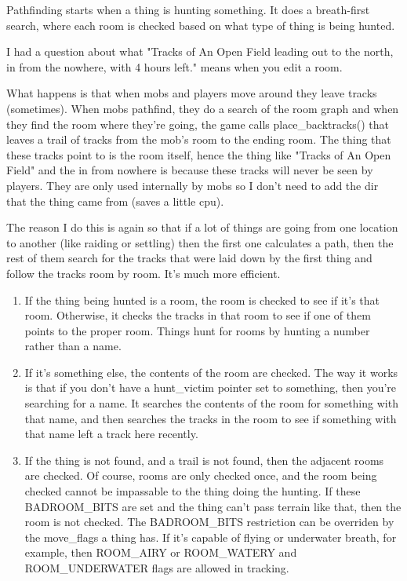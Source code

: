 Pathfinding starts when a thing is hunting something. It does a
breath-first search, where each room is checked based on what
type of thing is being hunted.


I had a question about what
\vv
"Tracks of An Open Field leading out to the north, in from the nowhere, with 4
hours left." 
\vv
means when you edit a room.

What happens is that when mobs and players move around they leave tracks
(sometimes). When mobs pathfind, they do a search of the room graph and when
they find the room where they're going, the game calls place\_backtracks()
that leaves a trail of tracks from the mob's room to the ending room. The
thing that these tracks point to is the room itself, hence the thing like
"Tracks of An Open Field" and the in from nowhere is because these tracks will
never be seen by players. They are only used internally by mobs so I don't
need to add the dir that the thing came from (saves a little cpu).

The reason I do this is again so that if a lot of things are going from one
location to another (like raiding or settling) then the first one calculates
a path, then the rest of them search for the tracks that were laid down
by the first thing and follow the tracks room by room. It's much more
efficient.


\begin{enumerate}

\item If the thing being hunted is a room, the room is checked to see
if it's that room. Otherwise, it checks the tracks in that room to
see if one of them points to the proper room. Things hunt for
rooms by hunting a number rather than a name.

\item If it's something else, the contents of the room are checked.
The way it works is that if you don't have a hunt\_victim
pointer set to something, then you're searching for a name.
It searches the contents of the room for something with that
name, and then searches the tracks in the room to see if something 
with that name left a track here recently.


\item If the thing is not found, and a trail is not found, then the
adjacent rooms are checked. Of course, rooms are only checked once,
and the room being checked cannot be impassable to the thing doing the
hunting. If these BADROOM\_BITS are set and the thing can't pass
terrain like that, then the room is not checked. The BADROOM\_BITS
restriction can be overriden by the move\_flags a thing has. If it's
capable of flying or underwater breath, for example, then ROOM\_AIRY
or ROOM\_WATERY and ROOM\_UNDERWATER flags are allowed in tracking.

\end{enumerate}

